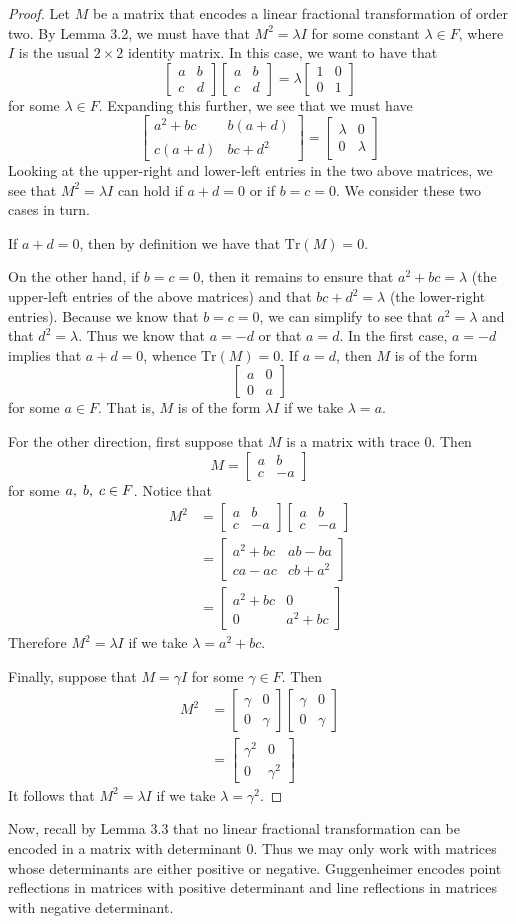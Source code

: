 \documentclass[12pt]{article}
\newcommand{\lftmat}[4]{\begin{bmatrix} {#1} & {#2} \\ {#3} & {#4} \end{bmatrix}}
\newcommand{\stanlftmat}{\lftmat{a}{b}{c}{d}}
\newcommand{\ttc}{, \hspace{1mm}}
\newcommand{\Tr}{\text{Tr}}
\theoremstyle{plain}
\theoremstyle{definition}
\begin{document}
\begin{proof}
Let $M$ be a matrix that encodes a linear fractional transformation of order two. By Lemma 3.2, we must have that $M^2 = \lambda I$ for some constant $\lambda \in F$, where $I$ is the usual $2 \times 2$ identity matrix. In this case, we want to have that 
	\[
		\stanlftmat \stanlftmat = \lambda \lftmat{1}{0}{0}{1}
	\]
for some $\lambda \in F$. Expanding this further, we see that we must have 
	\[
		\lftmat{a^2 + bc}{b(a+d)}{c(a+d)}{bc+d^2} =  \lftmat{\lambda}{0}{0}{\lambda}
	\]
Looking at the upper-right and lower-left entries in the two above matrices, we see that $M^2 = \lambda I$ can hold if $a + d = 0$ or if $b = c = 0$. We consider these two cases in turn.

If $a + d = 0$, then by definition we have that $\Tr(M) = 0$.

On the other hand, if $b = c = 0$, then it remains to ensure that $a^2 + bc = \lambda$ (the upper-left entries of the above matrices) and that $bc + d^2 = \lambda$ (the lower-right entries). Because we know that $b = c = 0$, we can simplify to see that $a^2 = \lambda$ and that $d^2 = \lambda$. Thus we know that $a = -d$ or that $a = d$. In the first case, $a = -d$ implies that $a + d = 0$, whence $\Tr(M) = 0$. If $a = d$, then $M$ is of the form 
\[\lftmat{a}{0}{0}{a}\]
for some $a \in F$. That is, $M$ is of the form $\lambda I$ if we take $\lambda = a$. 

For the other direction, first suppose that $M$ is a matrix with trace 0. Then
\[M = \lftmat{a}{b}{c}{-a}\]
for some $a \ttc b \ttc c \in F$. Notice that
\begin{align*}
M^2 & = \lftmat{a}{b}{c}{-a} \lftmat{a}{b}{c}{-a} \\[2ex]
& = \lftmat{a^2+bc}{ab - ba}{ca - ac}{cb+a^2} \\[2ex]
& = \lftmat{a^2+bc}{0}{0}{a^2 + bc}
\end{align*}
Therefore $M^2 = \lambda I$ if we take $\lambda = a^2 + bc$.

Finally, suppose that $M = \gamma I$ for some $\gamma \in F$. Then
\begin{align*}
M^2 & = \lftmat{\gamma}{0}{0}{\gamma} \lftmat{\gamma}{0}{0}{\gamma} \\[2ex]
& = \lftmat{\gamma^2}{0}{0}{\gamma^2}
\end{align*}
It follows that $M^2 = \lambda I$ if we take $\lambda = \gamma^2$.
\end{proof}

Now, recall by Lemma 3.3 that no linear fractional transformation can be encoded in a matrix with determinant 0. Thus we may only work with matrices whose determinants are either positive or negative. Guggenheimer encodes point reflections in matrices with positive determinant and line reflections in matrices with negative determinant. 
\end{document}
